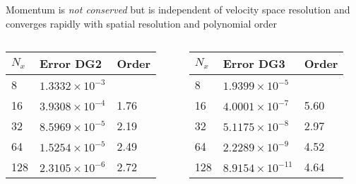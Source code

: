 \documentclass[pdf]{beamer}
\theoremstyle{definition}
\begin{document}
\begin{frame}{Momentum is \emph{not conserved} but is independent of
    velocity space resolution and converges rapidly with spatial
    resolution and polynomial order}%

  \begin{columns}
    \begin{column}{0.5\textwidth}
      \begin{tabulary}{\linewidth}{|L|L|L|}
        \hline
        
          $N_x$
        & {
          Error DG2
        } & {
          Order
        }\\
        & 
        $1.3332\times 10^{-3}$
        &  
        \\\hline
        
        16
        & 
        $3.9308\times 10^{-4}$
        & 
        1.76
        \\\hline
        
        32
        & 
        $8.5969\times 10^{-5}$
        & 
        2.19
        \\\hline
        
        64
        & 
        $1.5254\times 10^{-5}$
        & 
        2.49
        \\\hline
        
        128
        & 
        $2.3105\times 10^{-6}$
        & 
        2.72
        \\\hline
      \end{tabulary}
    \end{column}
    \begin{column}{0.5\textwidth}
      \begin{tabulary}{\linewidth}{|L|L|L|}
        \hline
        $N_x$
        & {
          Error DG3
        } & {
          Order
        }\\
        & 
        $1.9399\times 10^{-5}$
        &  
        \\\hline
        
        16
        & 
        $4.0001\times 10^{-7}$
        & 
        5.60
        \\\hline
        
        32
        & 
        $5.1175\times 10^{-8}$
        & 
        2.97
        \\\hline

        64
        & 
        $2.2289\times 10^{-9}$
        & 
        4.52
        \\\hline

        128
        & 
        $8.9154\times 10^{-11}$
        & 
        4.64
        \\\hline
      \end{tabulary}
    \end{column}
  \end{columns}

\end{frame}
\end{document}

